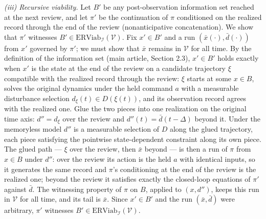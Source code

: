 \documentclass[11pt]{article}
\theoremstyle{definition}
\begin{document}
\emph{(iii) Recursive viability.} Let \(B'\) be any post-observation
information set reached at the next review, and let \(\pi'\) be the
continuation of \(\pi\) conditioned on the realized record through the
end of the review (nonanticipative concatenation). We show that
\(\pi'\) witnesses \(B' \in \mathrm{ERViab}_{\mathcal{I}}(\mathcal{V})\).
Fix \(x' \in B'\) and a run \((\bar{x}(\cdot), \bar{d}(\cdot))\) from
\(x'\) governed by \(\pi'\); we must show that \(\bar{x}\) remains in
\(\mathcal{V}\) for all time. By the definition of the information set
(main article, Section 2.3), \(x' \in B'\) holds exactly when \(x'\) is
the state at the end of the review on a candidate trajectory \(\xi\)
compatible with the realized record through the review: \(\xi\) starts
at some \(x \in B\), solves the original dynamics under the held
command \(a\) with a measurable disturbance selection
\(d_{\xi}(t) \in D(\xi(t))\), and its observation record agrees with
the realized one. Glue the two pieces into one realization on the
original time axis: \(d'' = d_{\xi}\) over the review and
\(d''(t) = \bar{d}(t - \Delta)\) beyond it. Under the memoryless model
\(d''\) is a measurable selection of \(D\) along the glued trajectory,
each piece satisfying the pointwise state-dependent constraint along
its own piece. The glued path --- \(\xi\) over the review, then
\(\bar{x}\) beyond --- is then a run of \(\pi\) from \(x \in B\) under
\(d''\): over the review its action is the held \(a\) with identical
inputs, so it generates the same record and \(\pi\)'s conditioning at
the end of the review is the realized one; beyond the review it
satisfies exactly the closed-loop equations of \(\pi'\) against
\(\bar{d}\). The witnessing property of \(\pi\) on \(B\), applied to
\((x, d'')\), keeps this run in \(\mathcal{V}\) for all time, and its
tail is \(\bar{x}\). Since \(x' \in B'\) and the run
\((\bar{x}, \bar{d})\) were arbitrary, \(\pi'\) witnesses
\(B' \in \mathrm{ERViab}_{\mathcal{I}}(\mathcal{V})\).
\end{document}
